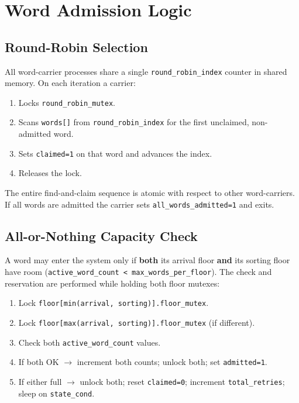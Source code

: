 \documentclass[12pt,a4paper]{article}
\newcommand{\code}[1]{\texttt{\small #1}}
\begin{document}
\section{Word Admission Logic}

\subsection{Round-Robin Selection}

All word-carrier processes share a single \code{round\_robin\_index} counter in
shared memory. On each iteration a carrier:

\begin{enumerate}
  \item Locks \code{round\_robin\_mutex}.
  \item Scans \code{words[]} from \code{round\_robin\_index} for the first
        unclaimed, non-admitted word.
  \item Sets \code{claimed=1} on that word and advances the index.
  \item Releases the lock.
\end{enumerate}

The entire find-and-claim sequence is atomic with respect to other word-carriers.
If all words are admitted the carrier sets \code{all\_words\_admitted=1} and exits.

\subsection{All-or-Nothing Capacity Check}

A word may enter the system only if \textbf{both} its arrival floor \textbf{and}
its sorting floor have room (\code{active\_word\_count < max\_words\_per\_floor}).
The check and reservation are performed while holding both floor mutexes:

\begin{enumerate}
  \item Lock \code{floor[min(arrival, sorting)].floor\_mutex}.
  \item Lock \code{floor[max(arrival, sorting)].floor\_mutex} (if different).
  \item Check both \code{active\_word\_count} values.
  \item If both OK $\rightarrow$ increment both counts; unlock both; set \code{admitted=1}.
  \item If either full $\rightarrow$ unlock both; reset \code{claimed=0};
        increment \code{total\_retries}; sleep on \code{state\_cond}.
\end{enumerate}
\end{document}
